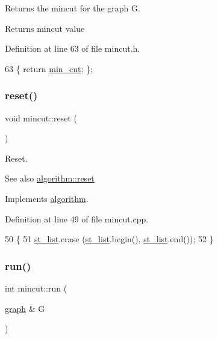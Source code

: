 Returns the mincut for the graph G.

\begin{DoxyReturn}{Returns}
mincut value 
\end{DoxyReturn}


Definition at line 63 of file mincut.\+h.


\begin{DoxyCode}
63 \{ \textcolor{keywordflow}{return} \mbox{\hyperlink{classmincut_a0d7cc01f8dd8b09c58dfb08c1123415f}{min\_cut}}; \};
\end{DoxyCode}
\mbox{\label{classmincut_a3f2142246a7b3e7b19b15d62314c9337}} 
\subsubsection{\texorpdfstring{reset()}{reset()}}
{\footnotesize\ttfamily void mincut\+::reset (\begin{DoxyParamCaption}{ }\end{DoxyParamCaption})\hspace{0.3cm}{\ttfamily [virtual]}}

Reset.

\begin{DoxySeeAlso}{See also}
\mbox{\hyperlink{classalgorithm_a21aba63d066ae7897de6ca7d8425c408}{algorithm\+::reset}} 
\end{DoxySeeAlso}


Implements \mbox{\hyperlink{classalgorithm_a21aba63d066ae7897de6ca7d8425c408}{algorithm}}.



Definition at line 49 of file mincut.\+cpp.


\begin{DoxyCode}
50 \{
51     \mbox{\hyperlink{classmincut_a1ef91db99ffc99172ba5e1de2c452c81}{st\_list}}.erase (\mbox{\hyperlink{classmincut_a1ef91db99ffc99172ba5e1de2c452c81}{st\_list}}.begin(), \mbox{\hyperlink{classmincut_a1ef91db99ffc99172ba5e1de2c452c81}{st\_list}}.end());
52 \}
\end{DoxyCode}
\mbox{\label{classmincut_ab7e374a3f73387aa61587643a5f44e43}} 
\subsubsection{\texorpdfstring{run()}{run()}}
{\footnotesize\ttfamily int mincut\+::run (\begin{DoxyParamCaption}\item[{\mbox{\hyperlink{classgraph}{graph}} \&}]{G }\end{DoxyParamCaption})\hspace{0.3cm}{\ttfamily [virtual]}}

